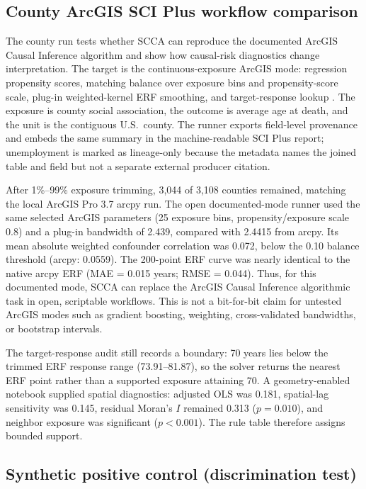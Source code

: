 \documentclass{article}
\begin{document}
\subsection{County ArcGIS SCI Plus workflow comparison}

The county run tests whether SCCA can reproduce the documented ArcGIS Causal Inference algorithm and show how causal-risk diagnostics change interpretation. The target is the continuous-exposure ArcGIS mode: regression propensity scores, matching balance over exposure bins and propensity-score scale, plug-in weighted-kernel ERF smoothing, and target-response lookup \citep{esri2026causalworks,wu2022matching,fan1996local}. The exposure is county social association, the outcome is average age at death, and the unit is the contiguous U.S.\ county. The runner exports field-level provenance and embeds the same summary in the machine-readable SCI Plus report; unemployment is marked as lineage-only because the metadata names the joined table and field but not a separate external producer citation.

After 1\%--99\% exposure trimming, 3{,}044 of 3{,}108 counties remained, matching the local ArcGIS Pro 3.7 arcpy run. The open documented-mode runner used the same selected ArcGIS parameters (25 exposure bins, propensity/exposure scale 0.8) and a plug-in bandwidth of 2.439, compared with 2.4415 from arcpy. Its mean absolute weighted confounder correlation was 0.072, below the 0.10 balance threshold (arcpy: 0.0559). The 200-point ERF curve was nearly identical to the native arcpy ERF (MAE = 0.015 years; RMSE = 0.044). Thus, for this documented mode, SCCA can replace the ArcGIS Causal Inference algorithmic task in open, scriptable workflows. This is not a bit-for-bit claim for untested ArcGIS modes such as gradient boosting, weighting, cross-validated bandwidths, or bootstrap intervals.

The target-response audit still records a boundary: 70 years lies below the trimmed ERF response range (73.91--81.87), so the solver returns the nearest ERF point rather than a supported exposure attaining 70. A geometry-enabled notebook supplied spatial diagnostics: adjusted OLS was 0.181, spatial-lag sensitivity was 0.145, residual Moran's $I$ remained 0.313 ($p = 0.010$), and neighbor exposure was significant ($p < 0.001$). The rule table therefore assigns bounded support.

\subsection{Synthetic positive control (discrimination test)}
\label{sec:core_control}
\end{document}

